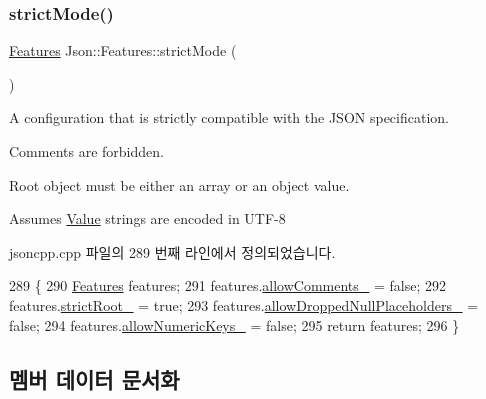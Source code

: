 \subsubsection{\texorpdfstring{strict\+Mode()}{strictMode()}}
{\footnotesize\ttfamily \hyperlink{class_json_1_1_features}{Features} Json\+::\+Features\+::strict\+Mode (\begin{DoxyParamCaption}{ }\end{DoxyParamCaption})\hspace{0.3cm}{\ttfamily [static]}}



A configuration that is strictly compatible with the J\+S\+ON specification. 


\begin{DoxyItemize}
\item Comments are forbidden.
\item Root object must be either an array or an object value.
\item Assumes \hyperlink{class_json_1_1_value}{Value} strings are encoded in U\+T\+F-\/8 
\end{DoxyItemize}

jsoncpp.\+cpp 파일의 289 번째 라인에서 정의되었습니다.


\begin{DoxyCode}
289                               \{
290   \hyperlink{class_json_1_1_features}{Features} features;
291   features.\hyperlink{class_json_1_1_features_a33afd389719624b6bdb23950b3c346c9}{allowComments\_} = \textcolor{keyword}{false};
292   features.\hyperlink{class_json_1_1_features_a1162c37a1458adc32582b585b552f9c3}{strictRoot\_} = \textcolor{keyword}{true};
293   features.\hyperlink{class_json_1_1_features_a5076aa72c05c7596ac339ede36c97a6a}{allowDroppedNullPlaceholders\_} = \textcolor{keyword}{false};
294   features.\hyperlink{class_json_1_1_features_aff3cb16b79d15d3d761b11a0dd6d4d6b}{allowNumericKeys\_} = \textcolor{keyword}{false};
295   \textcolor{keywordflow}{return} features;
296 \}
\end{DoxyCode}


\subsection{멤버 데이터 문서화}
\mbox{\label{class_json_1_1_features_a33afd389719624b6bdb23950b3c346c9}} 
